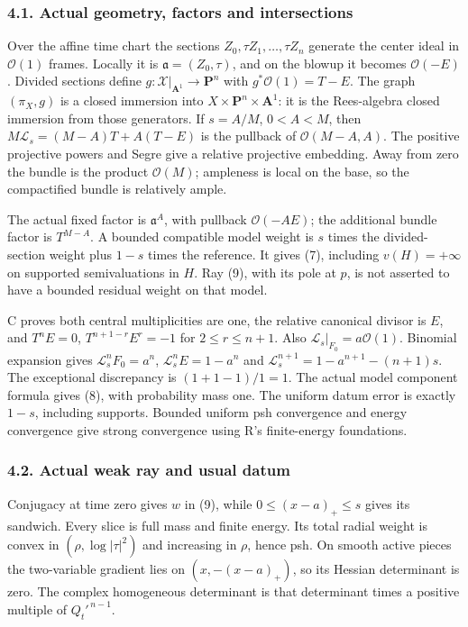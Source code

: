 \documentclass[
  11pt,
]{article}
\begin{document}
\subsubsection{4.1. Actual geometry, factors and
intersections}\label{actual-geometry-factors-and-intersections}

Over the affine time chart the sections \(Z_0,\tau Z_1,\ldots,\tau Z_n\)
generate the center ideal in \(\mathcal O(1)\) frames. Locally it is
\(\mathfrak a=(Z_0,\tau)\), and on the blowup it becomes
\(\mathcal O(-E)\). Divided sections define
\(g:\mathcal X|_{\mathbf A^1}\to\mathbf P^n\) with
\(g^*\mathcal O(1)=T-E\). The graph \((\pi_X,g)\) is a closed immersion
into \(X\times\mathbf P^n\times\mathbf A^1\): it is the Rees-algebra
closed immersion from those generators. If \(s=A/M\), \(0<A<M\), then
\(M\mathcal L_s=(M-A)T+A(T-E)\) is the pullback of
\(\mathcal O(M-A,A)\). The positive projective powers and Segre give a
relative projective embedding. Away from zero the bundle is the product
\(\mathcal O(M)\); ampleness is local on the base, so the compactified
bundle is relatively ample.

The actual fixed factor is \(\mathfrak a^A\), with pullback
\(\mathcal O(-AE)\); the additional bundle factor is \(T^{M-A}\). A
bounded compatible model weight is \(s\) times the divided-section
weight plus \(1-s\) times the reference. It gives (7), including
\(v(H)=+\infty\) on supported semivaluations in \(H\). Ray (9), with its
pole at \(p\), is not asserted to have a bounded residual weight on that
model.

C proves both central multiplicities are one, the relative canonical
divisor is \(E\), and \(T^nE=0\), \(T^{n+1-r}E^r=-1\) for
\(2\le r\le n+1\). Also \(\mathcal L_s|_{F_0}=a\mathcal O(1)\). Binomial
expansion gives \(\mathcal L_s^nF_0=a^n\), \(\mathcal L_s^nE=1-a^n\) and
\(\mathcal L_s^{n+1}=1-a^{n+1}-(n+1)s\). The exceptional discrepancy is
\((1+1-1)/1=1\). The actual model component formula gives (8), with
probability mass one. The uniform datum error is exactly \(1-s\),
including supports. Bounded uniform psh convergence and energy
convergence give strong convergence using R's finite-energy foundations.

\subsubsection{4.2. Actual weak ray and usual
datum}\label{actual-weak-ray-and-usual-datum}

Conjugacy at time zero gives \(w\) in (9), while \(0\le(x-a)_+\le s\)
gives its sandwich. Every slice is full mass and finite energy. Its
total radial weight is convex in \((\rho,\log|\tau|^2)\) and increasing
in \(\rho\), hence psh. On smooth active pieces the two-variable
gradient lies on \((x,-(x-a)_+)\), so its Hessian determinant is zero.
The complex homogeneous determinant is that determinant times a positive
multiple of \(Q_t'^{\,n-1}\).
\end{document}
